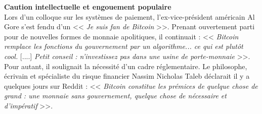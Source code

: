 \documentclass[11pt,twoside,a4paper]{article}
\begin{document}
\textbf{Caution intellectuelle et engouement populaire} ~\\

Lors d'un colloque sur les syst{\`e}mes de paiement, l'ex-vice-pr{\'e}sident am{\'e}ricain Al Gore s'est fendu d'un << \emph{Je suis fan de Bitcoin} >>. Prenant ouvertement parti pour de nouvelles formes de monnaie apolitiques, il continuait : << \emph{Bitcoin remplace les fonctions du gouvernement par un algorithme... ce qui est plut{\^o}t cool.} [....] \emph{Petit conseil : n'investissez pas dans une usine de porte-monnaie} >>. Pour autant, il soulignait la n{\'e}cessit{\'e} d'un cadre r{\'e}glementaire. Le philosophe, {\'e}crivain et sp{\'e}cialiste du risque financier Nassim Nicholas Taleb d{\'e}clarait il y a quelques jours sur Reddit : << \emph{Bitcoin constitue les pr{\'e}mices de quelque chose de grand : une monnaie sans gouvernement, quelque chose de n{\'e}cessaire et d'imp{\'e}ratif} >>. ~\\
\end{document}
